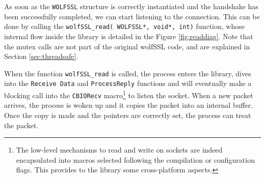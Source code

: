 As soon as the \texttt{WOLFSSL} structure is correctly instantiated and the handshake has been successfully completed, we can start listening to the connection. This can be done by calling the \texttt{wolfSSL\_read( WOLFSSL*, void*, int)} function, whose internal flow inside the library is detailed in the Figure \ref{fig:readdiag}. Note that the mutex calls are not part of the original wolfSSL code, and are explained in Section \ref{sec:threadsafe}.

When the function \texttt{wolfSSL\_read} is called, the process enters the library, dives into the \texttt{Receive Data} and \texttt{ProcessReply} functions and will eventually make a blocking call into the \texttt{CBIORecv} macro\footnote{The low-level mechanisms to read and write on sockets are indeed encapsulated into macros selected following the compilation or configuration flags. This provides to the library some cross-platform aspects.} to listen the socket. When a new packet arrives, the process is woken up and it copies the packet into an internal buffer. Once the copy is made and the pointers are correctly set, the process can treat the packet.

